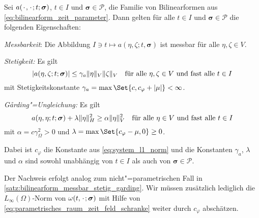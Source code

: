 \documentclass[../main.tex]{subfiles}
\begin{document}
\begin{Satz}
\label{satz:parametrische_bilinearform_messbar_stetig_garding}
    Sei $a({\mkern2mu\cdot\mkern2mu}, {\mkern2mu\cdot\mkern2mu}; t; \bm\sigma)$, $t \in I$ und $\bm\sigma \in \mathcal P$, die Familie von Bilinearformen aus \cref{eq:bilinearform_zeit_parameter}.
    Dann gelten für alle $t \in I$ und $\bm\sigma \in \mathcal P$ die folgenden Eigenschaften:
    \begin{thmenumerate}
        \item\label{satz:parametrische_bilinearform_messbar_stetig_garding:messbar}
        \emph{Messbarkeit}: Die Abbildung $I \ni t \mapsto a(\eta, \zeta; t, \bm\sigma)$ ist messbar für alle $\eta, \zeta \in V$.
        \item\label{satz:parametrische_bilinearform_messbar_stetig_garding:stetig}
        \emph{Stetigkeit:} Es gilt
        \begin{equation}
            \label{eq:parametrische_bilinearform_messbar_stetig_garding:stetig}
            \abs{a(\eta, \zeta; t; \bm\sigma)} \leq \gamma_{a} \norm{\eta}_{V} \norm{\zeta}_{V} \quad \fa \eta, \zeta \in V \text{ und fast alle } t \in I
        \end{equation}
        mit Stetigkeitskonstante $\gamma_{a} = \max\Set{c, c_{\varphi} + \abs{\mu}} < \infty$.
        \item\label{satz:parametrische_bilinearform_messbar_stetig_garding:garding}
        \emph{G\aa{}rding"=Ungleichung:} Es gilt
        \begin{equation}
            \label{eq:parametrische_bilinearform_messbar_stetig_garding:garding}
            a(\eta, \eta; t; \bm\sigma) + \lambda \norm{\eta}_{H}^{2} \geq \alpha \norm{\eta}_{V}^{2} \quad \fa \eta \in V \text{ und fast alle } t \in I
        \end{equation}
        mit $\alpha = c \gamma_{\Omega}^{2} > 0$ und $\lambda = \max\Set{c_{\varphi} - \mu, 0} \geq 0$.
    \end{thmenumerate}
    Dabei ist $c_{\varphi}$ die Konstante aus \cref{eq:system_l1_norm} und die Konstanten $\gamma_{a}$, $\lambda$ und $\alpha$ sind sowohl unabhängig von $t \in I$ als auch von $\bm\sigma \in \mathcal P$.

    \begin{Beweis}
        Der Nachweis erfolgt analog zum nicht"=parametrischen Fall in \cref{satz:bilinearform_messbar_stetig_garding}.
        Wir müssen zusätzlich lediglich die $L_{\infty}(\Omega)$-Norm von $\omega(t, {\mkern2mu\cdot\mkern2mu}; \bm\sigma)$ mit Hilfe von \cref{eq:parametrisches_raum_zeit_feld_schranke} weiter durch $c_{\varphi}$ abschätzen.
    \end{Beweis}
\end{Satz}
\end{document}
